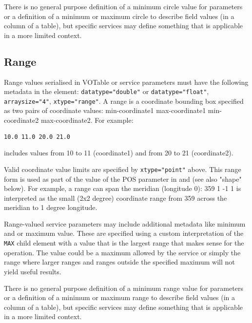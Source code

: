 \documentclass[11pt,letter]{ivoa}
\begin{document}
There is no general purpose definition of a minimum circle value for parameters or
a definition of a minimum or maximum circle to describe field values (in a column
of a table), but specific services may define something that is applicable in a
more limited context.

\subsection{Range}
Range values serialised in VOTable or service parameters must have the following
metadata in the  element: \verb|datatype="double"| or \verb|datatype="float"|,
\verb|arraysize="4"|, \verb|xtype="range"|. A range is a coordinate bounding box specified
as two pairs of coordinate values: min-coordinate1 max-coordinate1 min-coordinate2 max-coordinate2.
For example:

\begin{verbatim}
10.0 11.0 20.0 21.0
\end{verbatim}

\noindent
includes values from 10 to 11 (coordinate1) and from 20 to 21 (coordinate2).

Valid coordinate value limits are specified by \verb|xtype="point"| above. 
This range form is used as part of the value of the POS parameter in 
\citep{2015ivoa.spec.1223D} and \citep{2017ivoa.spec.0517B} (see also "shape" below). 
For example, a range can span the meridian (longitude 0): 359 1 -1 1 is interpreted
as the small (2x2 degree) coordinate range from 359 across the meridian to 1 degree 
longitude.

Range-valued service parameters may include additional metadata like minimum and
or maximum value. These are specified using a custom interpretation of the
\verb|MAX| child element with a value that is the largest range that makes sense
for the operation. The value could be a maximum allowed by the service or simply
the range where larger ranges and ranges outside the specified maximum will not yield
useful results.

There is no general purpose definition of a minimum range value for parameters or
a definition of a minimum or maximum range to describe field values (in a column
of a table), but specific services may define something that is applicable in a
more limited context.
\end{document}

